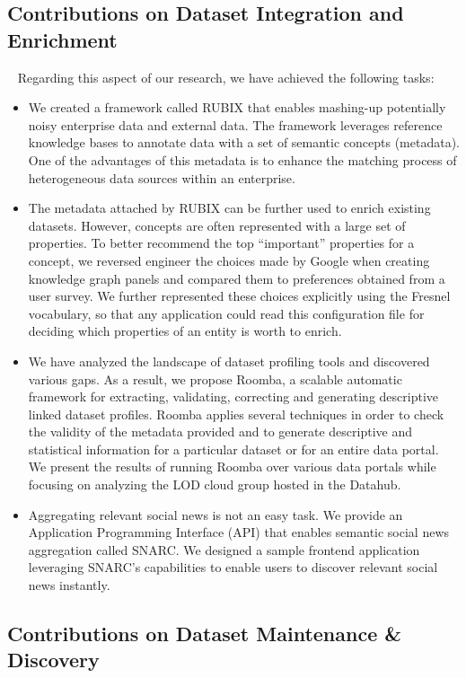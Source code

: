 \subsection{Contributions on Dataset Integration and Enrichment}~
Regarding this aspect of our research, we have achieved the following tasks:
\begin{itemize}
	\item We created a framework called RUBIX that enables mashing-up potentially noisy enterprise data and external data. The framework leverages reference knowledge bases to annotate data with a set of semantic concepts (metadata). One of the advantages of this metadata is to enhance the matching process of heterogeneous data sources within an enterprise.
	\item The metadata attached by RUBIX can be further used to enrich existing datasets. However, concepts are often represented with a large set of properties. To better recommend the top ``important'' properties for a concept, we reversed engineer the choices made by Google when creating knowledge graph panels and compared them to preferences obtained from a user survey. We further represented these choices explicitly using the Fresnel vocabulary, so that any application could read this configuration file for deciding which properties of an entity is worth to enrich.
	\item We have analyzed the landscape of dataset profiling tools and discovered various gaps. As a result, we propose Roomba, a scalable automatic framework for extracting, validating, correcting and generating descriptive linked dataset profiles. Roomba applies several techniques in order to check the validity of the metadata provided and to generate descriptive and statistical information for a particular dataset or for an entire data portal. We present the results of running Roomba over various data portals while focusing on analyzing the LOD cloud group hosted in the Datahub.
	\item Aggregating relevant social news is not an easy task. We provide an Application Programming Interface (API) that enables semantic social news aggregation called SNARC. We designed a sample frontend application leveraging SNARC's capabilities to enable users to discover relevant social news instantly.
\end{itemize}

\subsection{Contributions on Dataset Maintenance \& Discovery}

